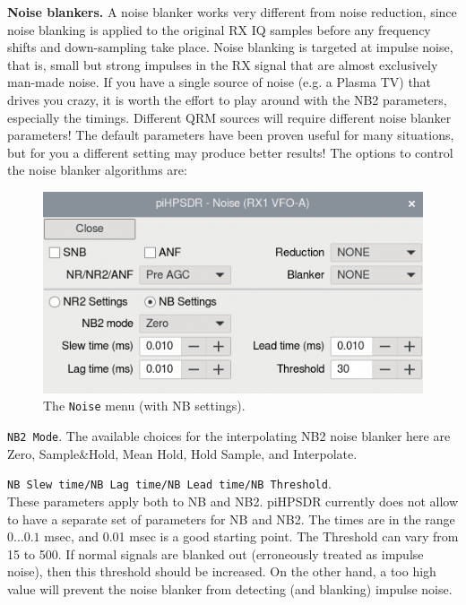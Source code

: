 \documentclass[12pt]{book}
\def\rett#1{\texttt{\color{red}#1}}
\def\bltt#1{\texttt{\color{blue}#1}}
\def\pH{pi\-HPSDR\xspace}
\begin{document}
\textbf{Noise blankers.} A noise blanker works very different from  noise reduction, since noise blanking
is applied to the original RX IQ samples before any frequency shifts and down-sampling take place.
Noise blanking is targeted at impulse noise, that is, small but strong impulses in the RX
signal that are almost exclusively man-made noise.
If you have a single source of noise (e.g. a Plasma TV) that drives you crazy, it is worth
the effort to play around with the NB2 parameters, especially the timings. Different
QRM sources will require different noise blanker parameters! The default parameters have been proven useful
for many situations, but for you a different setting may produce better results!
The options to control the noise blanker algorithms are:

\begin{figure}[ht]
\center
\includegraphics[scale=0.45]{NoiseMenu2.png}
\caption{The \bltt{Noise} menu (with NB settings).}
\label{fig:NoiseMenu2}
\end{figure}
\rett{NB2 Mode}. The available choices for the interpolating NB2 noise blanker here are Zero,
Sample\&Hold, Mean Hold, Hold Sample, and Interpolate.

\rett{NB Slew time/NB Lag time/NB Lead time/NB Threshold}.\\
These parameters apply both to NB and NB2.
\pH currently does not allow to have a separate set of parameters for NB and NB2.
The times are in the range $0\ldots0.1$ msec, and 0.01 msec is a good starting point. The Threshold
can vary from 15 to 500. If normal signals are blanked out (erroneously treated as impulse noise),
then this threshold should be increased. On the other hand, a too high value will prevent the
noise blanker from detecting (and blanking) impulse noise.


\end{document}

